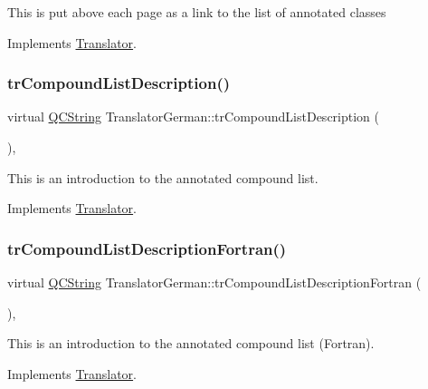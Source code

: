 This is put above each page as a link to the list of annotated classes 

Implements \mbox{\hyperlink{class_translator}{Translator}}.

\mbox{\label{class_translator_german_a828300b954024c81da91d90ac53f3844}} 
\subsubsection{\texorpdfstring{trCompoundListDescription()}{trCompoundListDescription()}}
{\footnotesize\ttfamily virtual \mbox{\hyperlink{class_q_c_string}{Q\+C\+String}} Translator\+German\+::tr\+Compound\+List\+Description (\begin{DoxyParamCaption}{ }\end{DoxyParamCaption})\hspace{0.3cm}{\ttfamily [inline]}, {\ttfamily [virtual]}}

This is an introduction to the annotated compound list. 

Implements \mbox{\hyperlink{class_translator}{Translator}}.

\mbox{\label{class_translator_german_a3a072c8499f837b155d57d94d7f179cc}} 
\subsubsection{\texorpdfstring{trCompoundListDescriptionFortran()}{trCompoundListDescriptionFortran()}}
{\footnotesize\ttfamily virtual \mbox{\hyperlink{class_q_c_string}{Q\+C\+String}} Translator\+German\+::tr\+Compound\+List\+Description\+Fortran (\begin{DoxyParamCaption}{ }\end{DoxyParamCaption})\hspace{0.3cm}{\ttfamily [inline]}, {\ttfamily [virtual]}}

This is an introduction to the annotated compound list (Fortran). 

Implements \mbox{\hyperlink{class_translator}{Translator}}.

